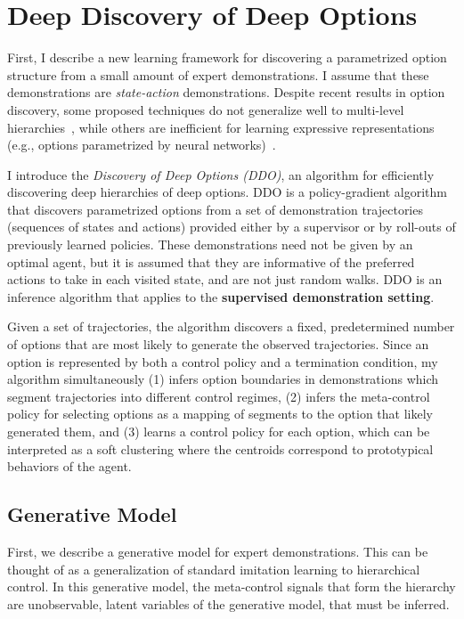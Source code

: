 \section{Deep Discovery of Deep Options}
\label{ddco}
First, I describe a new learning framework for discovering a parametrized option structure from a small amount of expert demonstrations.
I assume that these demonstrations are \emph{state-action} demonstrations.
Despite recent results in option discovery, some proposed techniques do not generalize well to multi-level hierarchies~\cite{kulkarni2016hierarchical, heess2016learning, baconHP16}, while others are inefficient for learning expressive representations (e.g., options parametrized by neural networks)~\cite{daniel2012hierarchical,lakshminarayananKKR16,hamidiTGF15,buiVW02}.

I introduce the \emph{Discovery of Deep Options (DDO)}, an algorithm for efficiently discovering deep hierarchies of deep options. DDO is a policy-gradient algorithm that discovers parametrized options from a set of demonstration trajectories (sequences of states and actions) provided either by a supervisor or by roll-outs of previously learned policies. These demonstrations need not be given by an optimal agent, but it is assumed that they are informative of the preferred actions to take in each visited state, and are not just random walks. DDO is an inference algorithm that applies to the \textbf{supervised demonstration setting}.

Given a set of trajectories, the algorithm discovers a fixed, predetermined number of options that are most likely to generate the observed trajectories. Since an option is represented by both a control policy and a termination condition, my algorithm simultaneously (1) infers option boundaries in demonstrations which segment trajectories into different control regimes, (2) infers the meta-control policy for selecting options as a mapping of segments to the option that likely generated them, and (3) learns a control policy for each option, which can be interpreted as a soft clustering where the centroids correspond to prototypical behaviors of the agent.

\subsection{Generative Model}
First, we describe a generative model for expert demonstrations.
This can be thought of as a generalization of standard imitation learning to hierarchical control. In this generative model, the meta-control signals that form the hierarchy are unobservable, latent variables of the generative model, that must be inferred.

